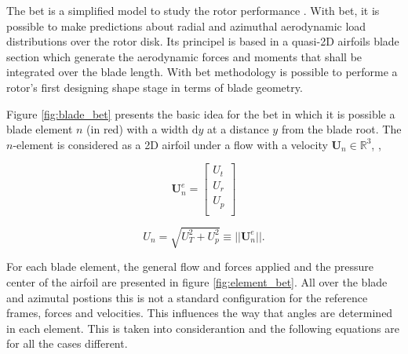 The \gls{bet} is a simplified model to study the rotor performance \cite{leishman_principles_2006}. With \gls{bet}, it is possible to make predictions about radial and azimuthal aerodynamic load distributions over the rotor disk. Its principel is based in a quasi-2D airfoils blade section which generate the aerodynamic forces and moments that shall be integrated over the blade length. With \gls{bet} methodology is possible to performe a rotor's first designing shape stage in terms of blade geometry.

Figure \ref{fig:blade_bet} presents the basic idea for the \gls{bet} in which it is possible a blade element $n$ (in red) with a width $\mathrm{d}y$ at a distance $y$ from the blade root. The $n$-element is considered as a 2D airfoil under a flow with a velocity $\mathbf{U}_n \in \mathbb{R}^3$, ,

\begin{equation}
    \mathbf{U}_n^e = 
    \begin{bmatrix}
        U_t \\
        U_r \\
        U_p \\
    \end{bmatrix}
    \label{eq:velocity_vector_in_element}
\end{equation}


\begin{equation}
    U_n = \sqrt{U_T^2 + U_p^2} \equiv || \mathbf{U}_n^e ||.
    \label{eq:result_vel_norm}
\end{equation}

For each blade element, the general flow and forces applied and the pressure center of the airfoil are presented in figure \ref{fig:element_bet}. All over the blade and azimutal postions this is not a standard configuration for the reference frames, forces and velocities. This influences the way that angles are determined in each element. This is taken into considerantion and the following equations are for all the cases different.

